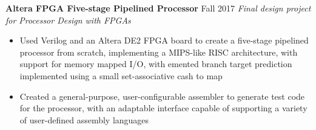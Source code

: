 \begin{samepage}
\textbf{Altera FPGA Five-stage Pipelined Processor}
\hfill
Fall 2017
\newline
\textit{Final design project for Processor Design with FPGAs}
\begin{itemize}[noitemsep,topsep=0pt,parsep=0pt,partopsep=0pt]
    \item Used Verilog and an Altera DE2 FPGA board to create a five-stage pipelined processor from scratch, implementing a MIPS-like RISC architecture, with support for memory mapped I/O, with emented branch target prediction implemented using a small set-associative cash to map
    \item Created a general-purpose, user-configurable assembler to generate test code for the processor, with an adaptable interface capable of supporting a variety of user-defined assembly languages
\end{itemize}
\end{samepage}
\smallskip